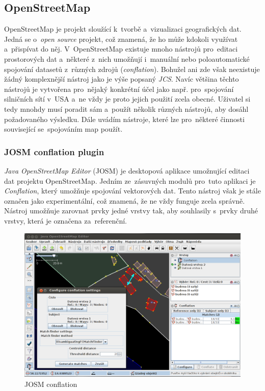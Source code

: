 
\subsection{OpenStreetMap}
\label{OSM}

OpenStreetMap je projekt sloužící k~tvorbě a~vizualizaci geografických dat.
Jedná se o~\textit{open source} projekt, což znamená, že ho může kdokoli 
využívat a~přispívat do něj. V~OpenStreetMap existuje mnoho nástrojů 
pro~editaci prostorových dat a~některé z~nich umožňují i~manuální nebo
poloautomatické spojování datasetů z~různých zdrojů (\textit{conflation}). 
Bohužel ani zde však neexistuje žádný komplexnější nástroj jako je výše
popsaný \textit{JCS}. Navíc většina těchto nástrojů je vytvořena pro~nějaký
konkrétní účel jako např. pro~spojování silničních sítí v~USA a~ne vždy
je proto jejich použití zcela obecné. Uživatel si tedy mnohdy musí poradit
sám a~použít několik různých nástrojů, aby dosáhl požadovaného výsledku.
Dále uvádím nástroje, které lze pro~některé činnosti související 
se~spojováním map použít. 

\subsubsection{JOSM conflation plugin}

\textit{Java OpenStreetMap Editor} (JOSM) je desktopová aplikace umožnující
editaci dat projektu OpenStreetMap. Jedním ze~zásuvných modulů pro~tuto 
aplikaci je \textit{Conflation}, který umožňuje spojování vektorových dat. 
Tento nástroj však je stále označen jako experimentální, což znamená, že ne 
vždy funguje zcela správně. Nástroj umožňuje zarovnat prvky jedné vrstvy tak,
aby souhlasily s~prvky druhé vrstvy, která je označena za~referenční. 

\label{josmpic}
  \begin{figure}[hbt]
    \centering
      \includegraphics[width=320pt]{./pictures/josm.png}
      \caption{JOSM conflation}
      \label{fig:josm}
  \end{figure} 

